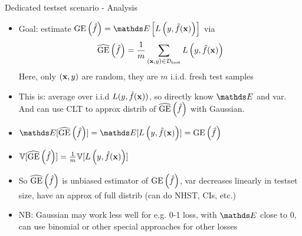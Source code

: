 \begin{frame}{Dedicated testset scenario - Analysis}
\begin{itemize}
\item Goal: estimate $\GEf = \E \left[\Lyfhx \right]$ via
$$\widehat{\mathrm{GE}}\left(\hat{f}\right) = \frac{1}{m} \sum_{(\mathbf{x}, y) \in \mathcal{D}_{\text{test}}} L\left(y, \hat{f}(\mathbf{x})\right) $$
Here, only $(\mathbf{x},y)$ are random, they are $m$ i.i.d. fresh test samples


\item This is: average over i.i.d $L(y, \hat{f}(\mathbf{x}))$,
    so directly know $\E$ and var. And can use CLT to approx distrib of $\widehat{\mathrm{GE}}\left(\hat{f}\right)$ with Gaussian.

\item $\E[\GEfh] = \E[\Lyfhx] = \GEf $

\item $\mathbb{V}[\widehat{\mathrm{GE}}\left(\hat{f}\right)] = \frac{1}{m} \mathbb{V}[L\left(y, \hat{f}(\mathbf{x})\right)]$ 

\item So $\widehat{\mathrm{GE}}\left(\hat{f}\right)$ is unbiased estimator of $\mathrm{GE}\left(\hat{f}\right)$, var decreases linearly in testset size, have an approx of full distrib (can do NHST, CIs, etc.)
\item NB: Gaussian may work less well for e.g. 0-1 loss, with $\E$ close to 0, can use binomial or other special approaches for other losses

\end{itemize}
\end{frame}

